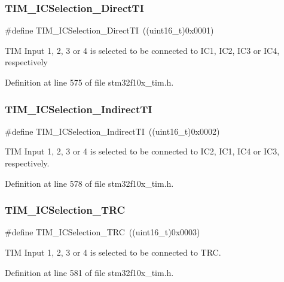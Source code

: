 \subsubsection{\texorpdfstring{T\+I\+M\+\_\+\+I\+C\+Selection\+\_\+\+Direct\+TI}{TIM\_ICSelection\_DirectTI}}
{\footnotesize\ttfamily \#define T\+I\+M\+\_\+\+I\+C\+Selection\+\_\+\+Direct\+TI~((uint16\+\_\+t)0x0001)}

T\+IM Input 1, 2, 3 or 4 is selected to be connected to I\+C1, I\+C2, I\+C3 or I\+C4, respectively 

Definition at line 575 of file stm32f10x\+\_\+tim.\+h.

\mbox{\label{group___t_i_m___input___capture___selection_ga2289b684133ac0b81ddfcd860d01b144}} 
\subsubsection{\texorpdfstring{T\+I\+M\+\_\+\+I\+C\+Selection\+\_\+\+Indirect\+TI}{TIM\_ICSelection\_IndirectTI}}
{\footnotesize\ttfamily \#define T\+I\+M\+\_\+\+I\+C\+Selection\+\_\+\+Indirect\+TI~((uint16\+\_\+t)0x0002)}

T\+IM Input 1, 2, 3 or 4 is selected to be connected to I\+C2, I\+C1, I\+C4 or I\+C3, respectively. 

Definition at line 578 of file stm32f10x\+\_\+tim.\+h.

\mbox{\label{group___t_i_m___input___capture___selection_ga2cd464e97ffd6ea3208ec65672f9a373}} 
\subsubsection{\texorpdfstring{T\+I\+M\+\_\+\+I\+C\+Selection\+\_\+\+T\+RC}{TIM\_ICSelection\_TRC}}
{\footnotesize\ttfamily \#define T\+I\+M\+\_\+\+I\+C\+Selection\+\_\+\+T\+RC~((uint16\+\_\+t)0x0003)}

T\+IM Input 1, 2, 3 or 4 is selected to be connected to T\+RC. 

Definition at line 581 of file stm32f10x\+\_\+tim.\+h.

